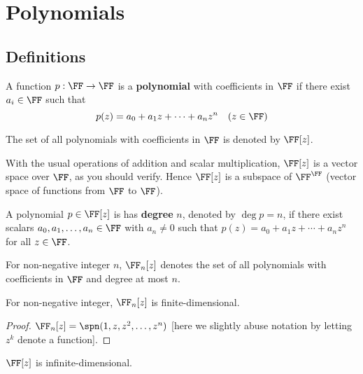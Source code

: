 \chapter{Polynomials}
\section{Definitions}
\begin{definition}[Polynomial]
A function $p:\FF\to\FF$ is a \textbf{polynomial} with coefficients in $\FF$ if there exist $a_i\in\FF$ such that
\[p(z)=a_0+a_1z+\cdots+a_nz^n\quad(z\in\FF)\]
\end{definition}

\begin{notation}
The set of all polynomials with coefficients in $\FF$ is denoted by $\FF[z]$.
\end{notation}

\begin{proposition}
With the usual operations of addition and scalar multiplication, $\FF[z]$ is a vector space over $\FF$, as you should verify. Hence $\FF[z]$ is a subspace of $\FF^\FF$ (vector space of functions from $\FF$ to $\FF$).
\end{proposition}

\begin{definition}[Degree]
A polynomial $p\in\FF[z]$ is has \textbf{degree} $n$, denoted by $\deg p=n$, if there exist scalars $a_0,a_1,\dots,a_n\in\FF$ with $a_n\neq0$ such that $p(z)=a_0+a_1z+\cdots+a_nz^n$ for all $z\in\FF$.
\end{definition}

\begin{notation}
For non-negative integer $n$, $\FF_n[z]$ denotes the set of all polynomials with coefficients in $\FF$ and degree at most $n$.
\end{notation}

\begin{proposition}
For non-negative integer, $\FF_n[z]$ is finite-dimensional.
\end{proposition}

\begin{proof}
$\FF_n[z]=\spn(1,z,z^2,\dots,z^n)$ [here we slightly abuse notation by letting $z^k$ denote a function]. 
\end{proof}

\begin{proposition}
$\FF[z]$ is infinite-dimensional.
\end{proposition}

